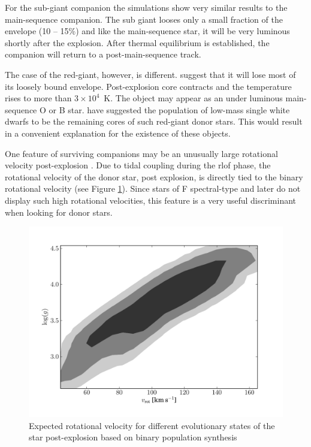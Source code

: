 For the sub-giant companion the simulations show very similar results to the main-sequence companion. The sub giant looses only a small fraction of the envelope (10 -- 15\%) and like the main-sequence star, it will be very luminous shortly after the explosion. After thermal equilibrium is established, the companion will return to a post-main-sequence track. 

The case of the red-giant, however, is different. \citet{2000ApJS..128..615M} suggest that it will lose most of its loosely bound envelope. Post-explosion core contracts and the temperature rises to more than $3 \times 10^4$~K. The object may appear as an under luminous main-sequence O or B star. \cite{2009A&A...493.1081J} have suggested the population of low-mass single white dwarfs to be the remaining cores of such red-giant donor stars. This would result in a convenient explanation for the existence of these objects. 

One feature of surviving companions may be an unusually large rotational velocity post-explosion \citep[][Chapter \ref{chap:sn1572_starg} of this work]{2009ApJ...701.1665K}. Due to tidal coupling during the \gls{rlof} phase, the rotational velocity  of the donor star, post explosion, is directly tied to the binary rotational velocity (see Figure \ref{fig:han2008_vrot}). Since stars of F spectral-type and later do not display such high rotational velocities, this feature is a very useful discriminant when looking for donor stars. 

\begin{figure}[tb] %
   \centering
   \includegraphics[width=\textwidth, trim=0 0 2cm 0, clip]{chapter_intro/plots/theo_vrot.pdf} 
   \caption[Expected rotational velocities of donor stars]{Expected rotational velocity for different evolutionary states of the  star post-explosion based on binary population synthesis \citep[][data kindly provided by Z. Han]{2008ApJ...677L.109H} }
   \label{fig:han2008_vrot}
\end{figure}


